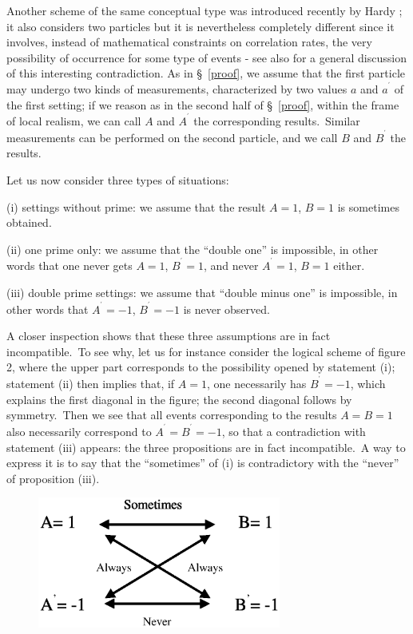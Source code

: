\documentclass[12pt,onecolumn]{article}%
\begin{document}
\label{hardy}

Another scheme of the same conceptual type was introduced recently by Hardy
\cite{Hardy}; it also considers two particles but it is nevertheless
completely different since it involves, instead of mathematical constraints on
correlation rates, the very possibility of occurrence for some type of events
- see also \cite{Mermin3} for a general discussion of this interesting
contradiction. As in \S \ \ref{proof}, we assume that the first particle may
undergo two kinds of measurements, characterized by two values $a$ and
$a^{^{\prime}}$ of the first setting; if we reason as in the second half of
\S \ \ref{proof}, within the frame of local realism, we can call $A$ and
$A^{^{\prime}}$ the corresponding results.\ Similar measurements can be
performed on the second particle, and we call $B$ and $B^{^{\prime}}$ the results.

Let us now consider three types of situations:

(i) settings without prime: we assume that the result $A=1$, $B=1$ is
sometimes obtained.

(ii) one prime only: we assume that the ``double one'' is impossible, in other
words that one never gets $A=1$, $B^{^{\prime}}=1$, and never $A^{^{\prime}%
}=1$, $B=1$ either.

(iii) double prime settings: we assume that ``double minus one'' is
impossible, in other words that $A^{^{\prime}}=-1$, $B^{^{\prime}}=-1$ is
never observed.

A closer inspection shows that these three assumptions are in fact
incompatible.\ To see why, let us for instance consider the logical scheme of
figure 2, where the upper part corresponds to the possibility opened by
statement (i); statement (ii) then implies that, if $A=1$, one necessarily has
$B^{^{\prime}}=-1$, which explains the first diagonal in the figure; the
second diagonal follows by symmetry.\ Then we see that all events
corresponding to the results $A=B=1$ also necessarily correspond to
$A^{^{\prime}}=B^{^{\prime}}=-1$, so that a contradiction with statement (iii)
appears: the three propositions are in fact incompatible.\ A way to express it
is to say that the ``sometimes'' of (i) is contradictory with the ``never'' of
proposition (iii). \begin{figure}[ptb]
\begin{center}
\includegraphics[width=8cm]{fig2.ps}\newline
\end{center}
\par
\label{fig 2}\end{figure}
\end{document}
